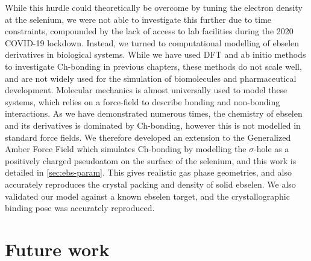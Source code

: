 \begin{refsection}
While this hurdle could theoretically be overcome by tuning the electron density at the selenium, we were not able to investigate this further due to time constraints, compounded by the lack of access to lab facilities during the 2020 COVID-19 lockdown.
Instead, we turned to computational modelling of ebselen derivatives in biological systems.
While we have used DFT and ab initio methods to investigate Ch-bonding in previous chapters, these methods do not scale well, and are not widely used for the simulation of biomolecules and pharmaceutical development.
Molecular mechanics is almost universally used to model these systems, which relies on a force-field to describe bonding and non-bonding interactions.
As we have demonstrated numerous times, the chemistry of ebselen and its derivatives is dominated by Ch-bonding, however this is not modelled in standard force fields.
We therefore developed an extension to the Generalized Amber Force Field which simulates Ch-bonding by modelling the $\sigma$-hole as a positively charged pseudoatom on the surface of the selenium, and this work is detailed in \cref{sec:ebs-param}.
This gives realistic gas phase geometries, and also accurately reproduces the crystal packing and density of solid ebselen.
We also validated our model against a known ebselen target, and the crystallographic binding pose was accurately reproduced.

\section{Future work}


\printbibliography[heading=subbibliography]
\end{refsection}
